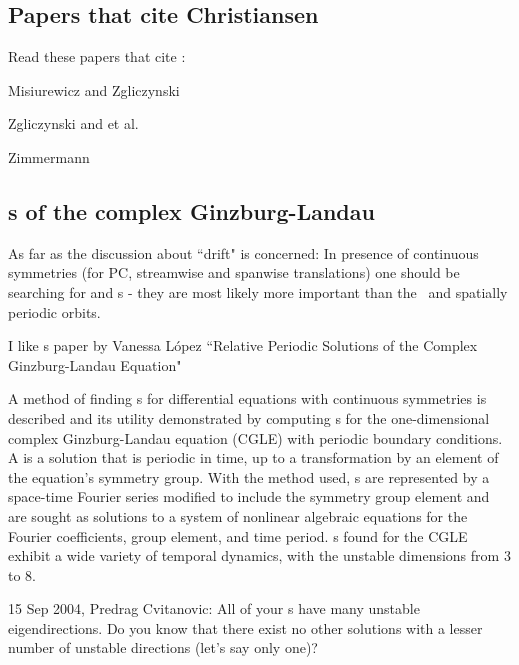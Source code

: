\subsection{Papers that cite Christiansen \etal}

Read these papers  that cite :

Misiurewicz and Zgliczynski

Zgliczynski and et al.

Zimmermann



\subsection{{\Rpo s} of the complex Ginzburg-Landau}

As far as the discussion about ``drift" is concerned:
In presence of continuous symmetries (for PC, streamwise and
spanwise translations) one should be searching for
{\reqva} and
{\rpo s} - they are most likely more important than
the \eqva\ and spatially periodic orbits.

I like {\rpo s} paper by
Vanessa L{\'o}pez %
``Relative Periodic Solutions of the Complex Ginzburg-Landau Equation"


A method of finding {\rpo s} for differential equations with
continuous symmetries is described and its utility demonstrated by computing
{\rpo s} for the one-dimensional complex Ginzburg-Landau
equation (CGLE) with periodic boundary conditions.  A {\rpo} is
a solution that is periodic in time, up to a transformation by an element of the
equation's symmetry group.  With the method used, {\rpo s} are
represented by a space-time Fourier series modified to include the symmetry
group element and are sought as solutions to a system of nonlinear algebraic
equations for the Fourier coefficients, group element, and time period.
{\Rpo s} found for the CGLE exhibit a wide variety of temporal
dynamics,
with the %
unstable dimensions from 3 to 8.

15 Sep 2004, Predrag Cvitanovic:
All of your {\Rpo s} have many unstable
eigendirections. Do you know that there exist no other solutions with a
lesser number of unstable directions (let's say only one)?

